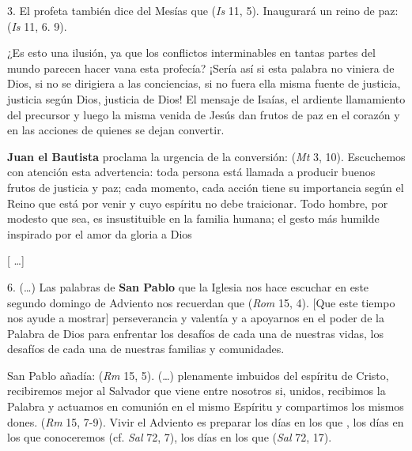 \begin{body}
\begin{body}
	3. El profeta también dice del Mesías que  (\emph{Is} 11, 5). Inaugurará un reino de paz:  (\emph{Is} 11, 6. 9).
	
	¿Es esto una ilusión, ya que los conflictos interminables en tantas partes del mundo parecen hacer vana esta profecía? ¡Sería así si esta palabra no viniera de Dios, si no se dirigiera a las conciencias, si no fuera ella misma fuente de justicia, justicia según Dios, justicia de Dios! El mensaje de Isaías, el ardiente llamamiento del precursor y luego la misma venida de Jesús dan frutos de paz en el corazón y en las acciones de quienes se dejan convertir.
	
	\textbf{Juan el Bautista} proclama la urgencia de la conversión:  (\emph{Mt} 3, 10). Escuchemos con atención esta advertencia: toda persona está llamada a producir buenos frutos de justicia y paz; cada momento, cada acción tiene su importancia según el Reino que está por venir y cuyo espíritu no debe traicionar. Todo hombre, por modesto que sea, es insustituible en la familia humana; el gesto más humilde inspirado por el amor da gloria a Dios
	
	{[} \ldots{}{]}
	
	6. (\ldots{}) Las palabras de \textbf{San Pablo} que la Iglesia nos hace escuchar en este segundo domingo de Adviento nos recuerdan que  (\emph{Rom} 15, 4). {[}Que este tiempo nos ayude a mostrar{]} perseverancia y valentía y a apoyarnos en el poder de la Palabra de Dios para enfrentar los desafíos de cada una de nuestras vidas, los desafíos de cada una de nuestras familias y comunidades.
	
	San Pablo añadía:  (\emph{Rm} 15, 5). (\ldots{}) plenamente imbuidos del espíritu de Cristo, recibiremos mejor al Salvador que viene entre nosotros si, unidos, recibimos la Palabra y actuamos en comunión en el mismo Espíritu y compartimos los mismos dones.  (\emph{Rm} 15, 7-9). Vivir el Adviento es preparar los días en los que , los días en los que conoceremos  (cf. \emph{Sal} 72, 7), los días en los que  (\emph{Sal} 72, 17).
	

\end{body}
\end{body}
